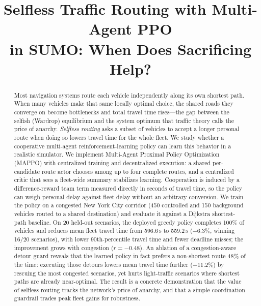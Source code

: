 \documentclass[conference]{IEEEtran}
\begin{document}
\title{Selfless Traffic Routing with Multi-Agent PPO\\in SUMO: When Does Sacrificing Help?}

\author{
}

\maketitle

\begin{abstract}
Most navigation systems route each vehicle independently along its own shortest
path. When many vehicles make that same locally optimal choice, the shared roads
they converge on become bottlenecks and total travel time rises---the gap between
the selfish (Wardrop) equilibrium and the system optimum that traffic theory calls
the price of anarchy. \emph{Selfless routing} asks a subset of vehicles to accept a
longer personal route when doing so lowers travel time for the whole fleet. We study
whether a cooperative multi-agent reinforcement-learning policy can learn this
behavior in a realistic simulator. We implement Multi-Agent Proximal Policy
Optimization (MAPPO) with centralized training and decentralized execution: a shared
per-candidate route actor chooses among up to four complete routes, and a centralized
critic that sees a fleet-wide summary stabilizes learning. Cooperation is induced by
a difference-reward team term measured directly in seconds of travel time, so the
policy can weigh personal delay against fleet delay without an arbitrary conversion.
We train the policy on a congested New York City corridor (450 controlled and 150
background vehicles routed to a shared destination) and evaluate it against a Dijkstra
shortest-path baseline. On 20 held-out scenarios, the deployed greedy policy completes
100\% of vehicles and reduces mean fleet travel time from 596.6\,s to 559.2\,s
($-6.3\%$, winning 16/20 scenarios), with lower 90th-percentile travel time and fewer
deadline misses; the improvement grows with congestion ($r=-0.48$). An ablation of a
congestion-aware detour guard reveals that the learned policy in fact prefers a
non-shortest route 48\% of the time: executing those detours lowers mean travel time
further ($-11.2\%$) by rescuing the most congested scenarios, yet hurts light-traffic
scenarios where shortest paths are already near-optimal. The result is a concrete
demonstration that the value of selfless routing tracks the network's price of anarchy,
and that a simple coordination guardrail trades peak fleet gains for robustness.
\end{abstract}
\end{document}

